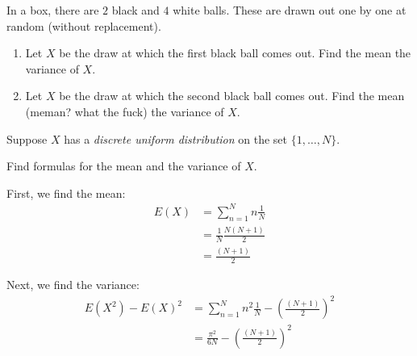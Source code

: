 \begin{problem}[Handout 7, \# 9]
  In a box, there are \(2\) black and \(4\) white balls. These are drawn
  out one by one at random (without replacement).
  \begin{enumerate}[label=(\alph*),noitemsep]
  \item Let \(X\) be the draw at which the first black ball comes out. Find
    the mean the variance of \(X\).
  \item Let \(X\) be the draw at which the second black ball comes
    out. Find the mean (meman? what the fuck) the variance of \(X\).
  \end{enumerate}
\end{problem}
\begin{solution}

\end{solution}
\newpage

\begin{problem}[Handout 7, \# 10]
  Suppose \(X\) has a \emph{discrete uniform distribution} on the set
  \(\{1,\dotsc,N\}\).

  Find formulas for the mean and the variance of \(X\).
\end{problem}
\begin{solution}

First, we find the mean: 
\begin{align*}
E(X) &= \sum\limits_{n=1}^N n \frac{1}{N}\\
&= \frac{1}{N} \frac{N(N+1)}{2}\\
&=\frac{(N+1)}{2}
\end{align*}

Next, we find the variance:
\begin{align*}
E(X^2) - E(X)^2 &= \sum\limits_{n=1}^N n^2 \frac{1}{N} - \left(\frac{(N+1)}{2}\right)^2\\
&=  \frac{\pi^2}{6N} - \left(\frac{(N+1)}{2}\right)^2\\
\end{align*}

\end{solution}
\newpage

